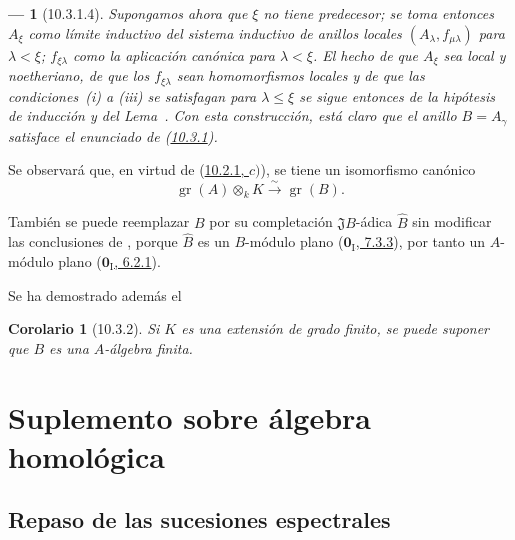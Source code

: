 \documentclass[10pt,oneside,openany]{book}
\theoremstyle{egaenv}\newtheorem*{env}{---}
\theoremstyle{egastatement}
\newtheorem*{corollary}{Corolario}
\theoremstyle{egadescription}
\newcommand{\oldpage}[2][]{\marginnote{\normalfont\scriptsize\textbf{#1}\,|\,#2}\ignorespaces}
\renewcommand{\leq}{\leqslant}
\begin{document}
\begin{env}[10.3.1.4]
Supongamos ahora que $\xi$ no tiene predecesor;
se toma entonces $A_\xi$ como límite inductivo del sistema inductivo de anillos locales $(A_\lambda,f_{\mu\lambda})$ para $\lambda<\xi$;
$f_{\xi\lambda}$ como la aplicación canónica para $\lambda<\xi$.
El hecho de que $A_\xi$ sea local y noetheriano, de que los $f_{\xi\lambda}$ sean homomorfismos locales y de que las condiciones~(i) a (iii) se satisfagan para $\lambda\leq\xi$
\oldpage[0\textsubscript{III}]{23}
se sigue entonces de la hipótesis de inducción y del Lema~.
Con esta construcción, está claro que el anillo $B=A_\gamma$ satisface el enunciado de (\hyperref[0.10.3.1-fr]{10.3.1}).
\end{env}

Se observará que, en virtud de (\hyperref[0.10.2.1-fr]{10.2.1, $c)$}), se tiene un isomorfismo canónico
\[
\label{0.10.3.1.5-fr}
  \operatorname{gr}(A)\otimes_k K\xrightarrow{\sim}\operatorname{gr}(B).
  \tag{10.3.1.5}
\]

También se puede reemplazar $B$ por su completación $\mathfrak J B$-ádica $\widehat B$ sin modificar las conclusiones de , porque $\widehat B$ es un $B$-módulo plano (\hyperref[0.7.3.3-fr]{$\mathbf{0}_{\mathrm I}$, 7.3.3}), por tanto un $A$-módulo plano (\hyperref[0.6.2.1-fr]{$\mathbf{0}_{\mathrm I}$, 6.2.1}).

Se ha demostrado además el

\begin{corollary}[10.3.2]
\label{0.10.3.2}
\label{0.10.3.2-fr}
Si $K$ es una extensión de grado finito, se puede suponer que $B$ es una $A$-álgebra finita.
\end{corollary}



\section{Suplemento sobre álgebra homológica}
\label{section:0.11}
\label{section:0.11-fr}

\subsection{Repaso de las sucesiones espectrales}
\label{subsection:0.11.1}
\label{subsection:0.11.1-fr}
\end{document}
